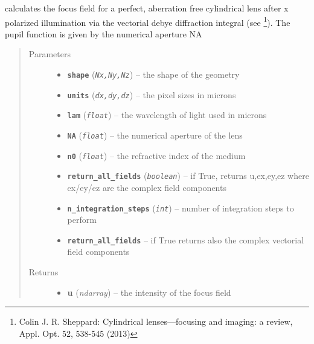 \documentclass[a4paper,10pt,english]{sphinxmanual}
\begin{document}
\begin{fulllineitems}
\label{beams:biobeam.focus_field_cylindrical}
calculates the focus field for a perfect, aberration free cylindrical lens after
x polarized illumination via the vectorial debye diffraction integral (see \footnote[2]{
Colin J. R. Sheppard: Cylindrical lenses—focusing and imaging: a review, Appl. Opt. 52, 538-545 (2013)
}).
The pupil function is given by the numerical aperture NA
\begin{quote}\begin{description}
\item[{Parameters}] \leavevmode\begin{itemize}
\item {} 
\textbf{\texttt{shape}} (\emph{\texttt{Nx,Ny,Nz}}) -- the shape of the geometry

\item {} 
\textbf{\texttt{units}} (\emph{\texttt{dx,dy,dz}}) -- the pixel sizes in microns

\item {} 
\textbf{\texttt{lam}} (\emph{\texttt{float}}) -- the wavelength of light used in microns

\item {} 
\textbf{\texttt{NA}} (\emph{\texttt{float}}) -- the numerical aperture of the lens

\item {} 
\textbf{\texttt{n0}} (\emph{\texttt{float}}) -- the refractive index of the medium

\item {} 
\textbf{\texttt{return\_all\_fields}} (\emph{\texttt{boolean}}) -- if True, returns u,ex,ey,ez where ex/ey/ez are the complex field components

\item {} 
\textbf{\texttt{n\_integration\_steps}} (\emph{\texttt{int}}) -- number of integration steps to perform

\item {} 
\textbf{\texttt{return\_all\_fields}} -- if True returns also the complex vectorial field components

\end{itemize}

\item[{Returns}] \leavevmode
\begin{itemize}
\item {} 
\textbf{u} (\emph{ndarray}) --
the intensity of the focus field


\end{itemize}
\end{description}
\end{quote}
\end{fulllineitems}
\end{document}

